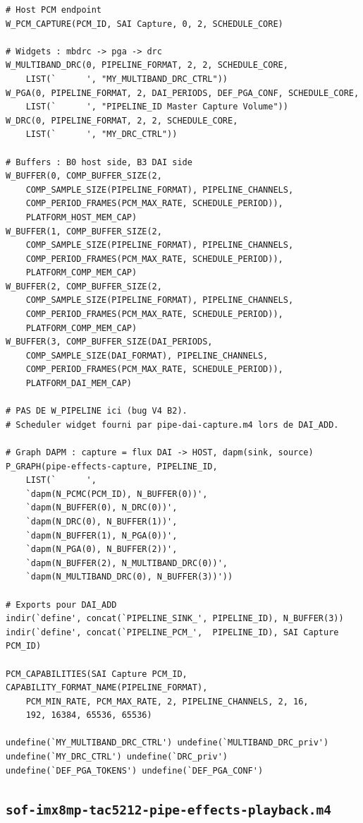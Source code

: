 \documentclass[11pt,a4paper]{article}
\begin{document}
\begin{lstlisting}[language={}, basicstyle=\ttfamily\scriptsize]
# Host PCM endpoint
W_PCM_CAPTURE(PCM_ID, SAI Capture, 0, 2, SCHEDULE_CORE)

# Widgets : mbdrc -> pga -> drc
W_MULTIBAND_DRC(0, PIPELINE_FORMAT, 2, 2, SCHEDULE_CORE,
    LIST(`      ', "MY_MULTIBAND_DRC_CTRL"))
W_PGA(0, PIPELINE_FORMAT, 2, DAI_PERIODS, DEF_PGA_CONF, SCHEDULE_CORE,
    LIST(`      ', "PIPELINE_ID Master Capture Volume"))
W_DRC(0, PIPELINE_FORMAT, 2, 2, SCHEDULE_CORE,
    LIST(`      ', "MY_DRC_CTRL"))

# Buffers : B0 host side, B3 DAI side
W_BUFFER(0, COMP_BUFFER_SIZE(2,
    COMP_SAMPLE_SIZE(PIPELINE_FORMAT), PIPELINE_CHANNELS,
    COMP_PERIOD_FRAMES(PCM_MAX_RATE, SCHEDULE_PERIOD)),
    PLATFORM_HOST_MEM_CAP)
W_BUFFER(1, COMP_BUFFER_SIZE(2,
    COMP_SAMPLE_SIZE(PIPELINE_FORMAT), PIPELINE_CHANNELS,
    COMP_PERIOD_FRAMES(PCM_MAX_RATE, SCHEDULE_PERIOD)),
    PLATFORM_COMP_MEM_CAP)
W_BUFFER(2, COMP_BUFFER_SIZE(2,
    COMP_SAMPLE_SIZE(PIPELINE_FORMAT), PIPELINE_CHANNELS,
    COMP_PERIOD_FRAMES(PCM_MAX_RATE, SCHEDULE_PERIOD)),
    PLATFORM_COMP_MEM_CAP)
W_BUFFER(3, COMP_BUFFER_SIZE(DAI_PERIODS,
    COMP_SAMPLE_SIZE(DAI_FORMAT), PIPELINE_CHANNELS,
    COMP_PERIOD_FRAMES(PCM_MAX_RATE, SCHEDULE_PERIOD)),
    PLATFORM_DAI_MEM_CAP)

# PAS DE W_PIPELINE ici (bug V4 B2).
# Scheduler widget fourni par pipe-dai-capture.m4 lors de DAI_ADD.

# Graph DAPM : capture = flux DAI -> HOST, dapm(sink, source)
P_GRAPH(pipe-effects-capture, PIPELINE_ID,
    LIST(`      ',
    `dapm(N_PCMC(PCM_ID), N_BUFFER(0))',
    `dapm(N_BUFFER(0), N_DRC(0))',
    `dapm(N_DRC(0), N_BUFFER(1))',
    `dapm(N_BUFFER(1), N_PGA(0))',
    `dapm(N_PGA(0), N_BUFFER(2))',
    `dapm(N_BUFFER(2), N_MULTIBAND_DRC(0))',
    `dapm(N_MULTIBAND_DRC(0), N_BUFFER(3))'))

# Exports pour DAI_ADD
indir(`define', concat(`PIPELINE_SINK_', PIPELINE_ID), N_BUFFER(3))
indir(`define', concat(`PIPELINE_PCM_',  PIPELINE_ID), SAI Capture PCM_ID)

PCM_CAPABILITIES(SAI Capture PCM_ID, CAPABILITY_FORMAT_NAME(PIPELINE_FORMAT),
    PCM_MIN_RATE, PCM_MAX_RATE, 2, PIPELINE_CHANNELS, 2, 16,
    192, 16384, 65536, 65536)

undefine(`MY_MULTIBAND_DRC_CTRL') undefine(`MULTIBAND_DRC_priv')
undefine(`MY_DRC_CTRL') undefine(`DRC_priv')
undefine(`DEF_PGA_TOKENS') undefine(`DEF_PGA_CONF')
\end{lstlisting}

\subsection{\texttt{sof-imx8mp-tac5212-pipe-effects-playback.m4}}
\end{document}
